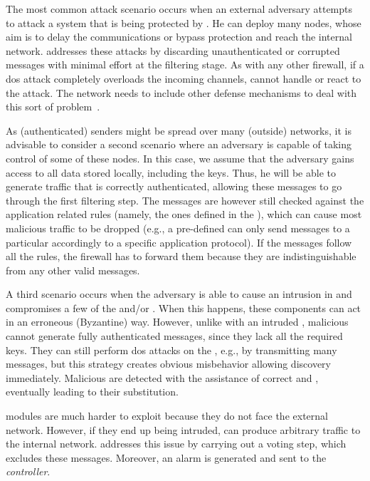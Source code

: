 The most common attack scenario occurs when an external adversary attempts to attack a system that is being protected by \sieveq. 
He can deploy many nodes, whose aim is to delay the communications or bypass \sieveq protection and reach the internal network. 
\sieveq addresses these attacks by discarding unauthenticated or corrupted messages with minimal effort at the \presieve filtering stage.
As with any other firewall, if a \gls{dos} attack completely overloads the incoming channels, \sieveq cannot handle or react to the attack.
The network needs to include other defense mechanisms to deal with this sort of problem~\cite{Mishra:2011}.

As (authenticated) senders might be spread over many (outside) networks, it is advisable to consider a second scenario where an adversary is capable of taking control of some of these nodes. 
In this case, we assume that the adversary gains access to all data stored locally, including the \sender keys. 
Thus, he will be able to generate traffic that is correctly authenticated, allowing these messages to go through the first filtering step.
The messages are however still checked against the application related rules (namely, the ones defined in the \repsieve), which can cause most malicious traffic to be dropped (e.g., a pre-defined \sender can only send messages to a particular \postsieve accordingly to a specific application protocol).
If the messages follow all the rules, the firewall has to forward them because they are indistinguishable from any other valid messages.

A third scenario occurs when the adversary is able to cause an intrusion in \sieveq and compromises a few of the \presieves and/or \repsieves. 
When this happens, these components can act in an erroneous (Byzantine) way. 
However, unlike with an intruded \sender, malicious \presieves cannot generate fully authenticated messages, since they lack all the required keys. 
They can still perform \gls{dos} attacks on the \repsieves, e.g., by transmitting many messages, but this strategy creates obvious misbehavior allowing discovery immediately. 
Malicious \presieves are detected with the assistance of correct \sender and \repsieves, eventually leading to their substitution.

\Repsieves modules are much harder to exploit because they do not face the external network. However, if they end up being intruded, \repsieves can produce arbitrary traffic to the internal network. \Postsieve addresses this issue by carrying out a voting step, which excludes these messages. Moreover, an alarm is generated and sent to the \emph{controller}.


